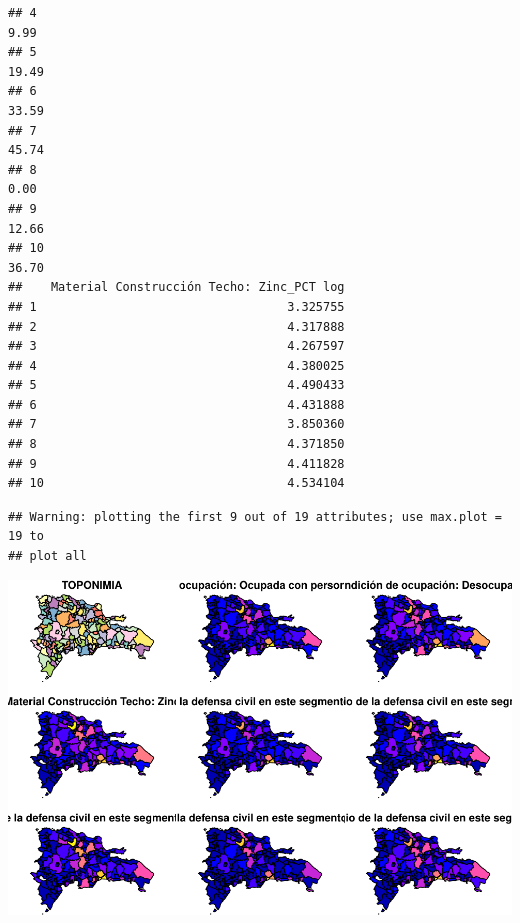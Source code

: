 \documentclass[11pt,]{article}
\newenvironment{Shaded}{\begin{snugshade}}{\end{snugshade}}
\newcommand{\KeywordTok}[1]{\textcolor[rgb]{0.13,0.29,0.53}{\textbf{#1}}}
\newcommand{\DataTypeTok}[1]{\textcolor[rgb]{0.13,0.29,0.53}{#1}}
\newcommand{\StringTok}[1]{\textcolor[rgb]{0.31,0.60,0.02}{#1}}
\newcommand{\OperatorTok}[1]{\textcolor[rgb]{0.81,0.36,0.00}{\textbf{#1}}}
\newcommand{\NormalTok}[1]{#1}
\begin{document}
\begin{verbatim}
## 4                                                                    9.99
## 5                                                                   19.49
## 6                                                                   33.59
## 7                                                                   45.74
## 8                                                                    0.00
## 9                                                                   12.66
## 10                                                                  36.70
##    Material Construcción Techo: Zinc_PCT log
## 1                                   3.325755
## 2                                   4.317888
## 3                                   4.267597
## 4                                   4.380025
## 5                                   4.490433
## 6                                   4.431888
## 7                                   3.850360
## 8                                   4.371850
## 9                                   4.411828
## 10                                  4.534104
\end{verbatim}

\begin{Shaded}
\end{Shaded}

\begin{verbatim}
## Warning: plotting the first 9 out of 19 attributes; use max.plot = 19 to
## plot all
\end{verbatim}

\includegraphics{proyecto_files/figure-latex/unnamed-chunk-2-1.pdf}
\end{document}
